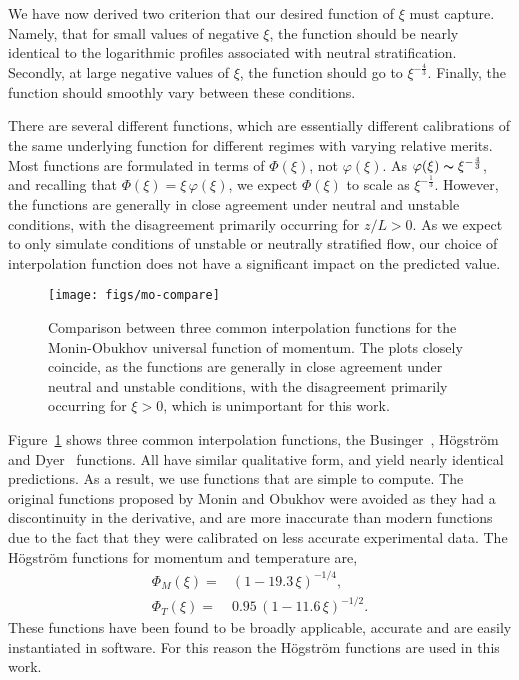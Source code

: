 We have now derived two criterion that our desired function of $\xi$ 
must capture. Namely, that for small values of negative $\xi$, the
function should be nearly identical to the logarithmic profiles
associated with neutral stratification. Secondly, at large negative
values of $\xi$, the function should go to
$\xi^{-\frac{4}{3}}$. Finally, the function should smoothly vary between
these conditions.  

There are several different functions, which are essentially different
calibrations of the same underlying function for different regimes with 
varying relative merits. 
Most functions are formulated in terms of $\Phi(\xi)$, 
not $\varphi(\xi)$. As
$\varphi(\xi) \thicksim \xi^{-\frac{4}{3}}$, and recalling that
$\Phi(\xi) = \xi \, \varphi(\xi)$, we expect 
$\Phi(\xi)$ to scale as $\xi^{-\frac{1}{3}}$.
%
However, the functions are generally in close agreement under neutral
and unstable conditions, with the disagreement primarily occurring for
$z/L>0$. As we expect to only simulate conditions of unstable or
neutrally stratified flow, our choice of interpolation function does not
have a significant impact on the predicted value.  

\begin{figure}[!htb]
 \centering
  \texttt{[image: figs/mo-compare]}\\
 \caption{Comparison between three common interpolation functions for
 the Monin-Obukhov universal function of momentum. The plots closely
 coincide, as the functions are generally in close agreement under
 neutral and unstable conditions, with the disagreement primarily
 occurring for $\xi > 0$, which is unimportant for this work.} 
 \label{fig:interp-mo}
\end{figure}

Figure~\ref{fig:interp-mo} shows three common interpolation  
functions, the Businger~\cite{businger1971flux},
H{\"o}gstr{\"o}m~\cite{hogstrom1988non} and Dyer~\cite{dyer1974review}
functions. All have similar qualitative form,   
and yield nearly identical predictions. As a result, we use functions
that are simple to compute. The original functions 
proposed by Monin and Obukhov were avoided as they had a discontinuity in
the derivative, and are more inaccurate than modern functions due to
the fact that they were calibrated on less accurate experimental
data. The H{\"o}gstr{\"o}m functions for momentum and temperature are, 
\begin{eqnarray}
  \Phi_M(\xi) =& (1-19.3 \, \xi)^{-1/4}, \\
  \Phi_T(\xi) =& 0.95 \, (1-11.6 \,\xi)^{-1/2}.
\end{eqnarray}
These functions have been found to be broadly applicable, accurate and 
are easily instantiated in software. For this reason the
H{\"o}gstr{\"o}m functions are used in this work. 

